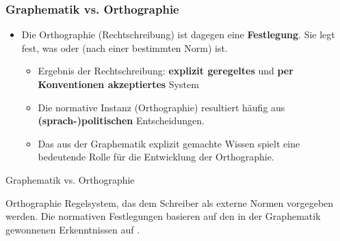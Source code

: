\begin{frame}
\frametitle{Graphematik vs. Orthographie}

\begin{itemize}
	\item Die Orthographie (Rechtschreibung) ist dagegen eine \textbf{ Festlegung}. Sie legt fest, was \textbf{} oder \textbf{} (nach einer bestimmten Norm) ist.
	
	\begin{itemize}
		\item Ergebnis der Rechtschreibung: \textbf{explizit geregeltes} und \textbf{per Konventionen akzeptiertes} System
		
		\item Die normative Instanz (Orthographie) resultiert häufig aus \textbf{(sprach-)politischen} Entscheidungen.
		
		\item Das aus der Graphematik explizit gemachte Wissen spielt eine bedeutende Rolle für die Entwicklung der Orthographie.
	\end{itemize}
\end{itemize}

\end{frame}


\begin{frame}{Graphematik vs. Orthographie}

\begin{block}{Orthographie}
	Regelsystem, das dem Schreiber als externe Normen vorgegeben werden. Die normativen Festlegungen basieren \idR auf den in der Graphematik gewonnenen Erkenntnissen auf \citep[vgl.][141]{Duerscheid04a}.
\end{block}

\end{frame}


